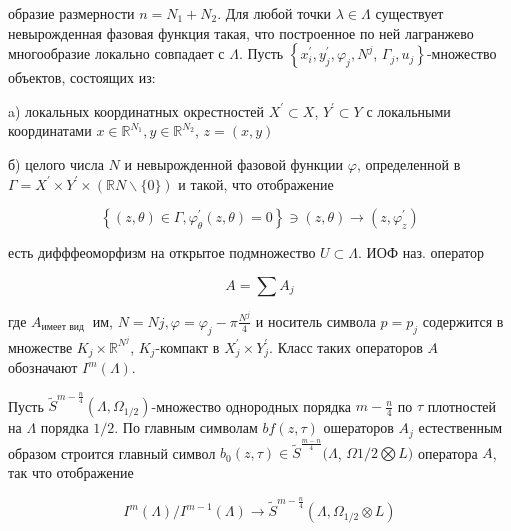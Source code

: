 \documentclass[10pt]{article}
\begin{document}
образие размерности $n=N_{1}+N_{2}$. Для любой точки $\lambda \in \Lambda$ существует невырожденная фазовая функция такая, что построенное по ней лагранжево многообразие локально совпадает с $\Lambda$. Пусть $\left\{x_{i}^{\prime}, y_{j}^{\prime}, \varphi_{j}, N^{j}\right.$, $\left.\Gamma_{j}, u_{j}\right\}$-множество объектов, состоящих из:



a) локальных координатных окрестностей $X^{\prime} \subset X$, $Y^{\prime} \subset Y$ с локальными координатами $x \in \mathbb{R}^{N_{1}}, y \in \mathbb{R}^{N_{2}}$, $z=(x, y)$



б) целого числа $N$ и невырожденной фазовой функции $\varphi$, определенной в $\Gamma=X^{\prime} \times Y^{\prime} \times(\mathbb{R} N \backslash\{0\})$ и такой, что отображение



\[

\left\{(z, \theta) \in \Gamma, \varphi_{\theta}^{\prime}(z, \theta)=0\right\} \ni(z, \theta) \longrightarrow\left(z, \varphi_{z}^{\prime}\right)

\]



есть дифффеоморфизм на открытое подмножество $U \subset \Lambda$. ИОФ наз. оператор



\[

A=\sum A_{j}

\]



где $A_{\text {имеет вид }}$ им, $N=N j, \varphi=\varphi_{j}-\pi \frac{N^{j}}{4}$ и носитель символа $p=p_{j}$ содержится в множестве $K_{j} \times \mathbb{R}^{N^{j}}$, $K_{j}$-компакт в $X_{j}^{\prime} \times Y_{j}^{\prime}$. Класс таких операторов $A$ обозначают $I^{m}(\Lambda)$.



Пусть $\tilde{S}^{m-\frac{n}{4}}\left(\Lambda, \Omega_{1 / 2}\right)$-множество однородных порядка $m-\frac{n}{4}$ по $\tau$ плотностей на $\Lambda$ порядка $1 / 2$. По главным символам $b f(z, \tau)$ ошераторов $A_{j}$ естественным образом строится главный символ $b_{0}(z, \tau) \in \widetilde{S}^{\frac{m-n}{4}}(\Lambda$, $\Omega 1 / 2 \bigotimes L)$ оператора $A$, так что отображение



\[

I^{m}(\Lambda) / I^{m-1}(\Lambda) \rightarrow \tilde{S}^{m-\frac{n}{4}}\left(\Lambda, \Omega_{1 / 2} \otimes L\right)

\]
\end{document}
